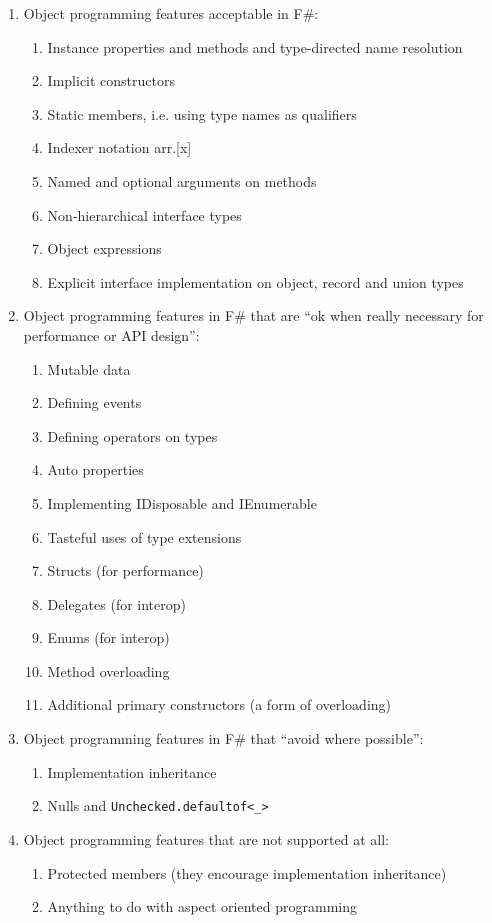 \documentclass[acmsmall]{acmart}\settopmatter{}
\begin{document}
\begin{enumerate}
\it
\item Object programming features acceptable in F\#:
\begin{enumerate}
\item Instance properties and methods and type-directed name resolution
\item Implicit constructors 
\item Static members, i.e. using type names as qualifiers
\item Indexer notation arr.[x]  
\item Named and optional arguments on methods
\item Non-hierarchical interface types
\item Object expressions 
\item Explicit interface implementation on object, record and union types
\end{enumerate}

\item Object programming features in F\# that are “ok when really necessary for performance or API design”: 
\begin{enumerate}
\item Mutable data
\item Defining events
\item Defining operators on types
\item Auto properties
\item Implementing IDisposable and IEnumerable
\item Tasteful uses of type extensions
\item Structs (for performance)
\item Delegates (for interop)
\item Enums (for interop)
\item Method overloading
\item Additional primary constructors (a form of overloading)
\end{enumerate}

\item Object programming features in F\# that ``avoid where possible'':

\begin{enumerate}
\item Implementation inheritance
\item Nulls and \texttt{Unchecked.defaultof<\_>}
\end{enumerate}

\item Object programming features that are not supported at all:

\begin{enumerate}
\item Protected members (they encourage implementation inheritance)
\item Anything to do with aspect oriented programming
\end{enumerate}
\end{enumerate}
\end{document}
